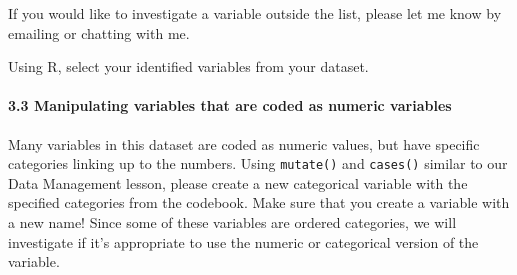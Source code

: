 \documentclass[
  letterpaper,
  DIV=11,
  numbers=noendperiod]{scrartcl}
\let\oldparagraph\paragraph
\renewcommand{\paragraph}[1]{\oldparagraph{#1}\mbox{}}
\begin{document}
If you would like to investigate a variable outside the list, please let
me know by emailing or chatting with me.

\begin{tcolorbox}[enhanced jigsaw, left=2mm, opacitybacktitle=0.6, arc=.35mm, colback=white, colframe=quarto-callout-important-color-frame, bottomrule=.15mm, opacityback=0, toptitle=1mm, toprule=.15mm, titlerule=0mm, colbacktitle=quarto-callout-important-color!10!white, rightrule=.15mm, leftrule=.75mm, title=\textcolor{quarto-callout-important-color}{\faExclamation}\hspace{0.5em}{Task}, breakable, bottomtitle=1mm, coltitle=black]

Using R, select your identified variables from your dataset.

\end{tcolorbox}

\hypertarget{manipulating-variables-that-are-coded-as-numeric-variables}{%
\paragraph{3.3 Manipulating variables that are coded as numeric
variables}\label{manipulating-variables-that-are-coded-as-numeric-variables}}

Many variables in this dataset are coded as numeric values, but have
specific categories linking up to the numbers. Using \texttt{mutate()}
and \texttt{cases()} similar to our Data Management lesson, please
create a new categorical variable with the specified categories from the
codebook. Make sure that you create a variable with a new name! Since
some of these variables are ordered categories, we will investigate if
it's appropriate to use the numeric or categorical version of the
variable.
\end{document}

